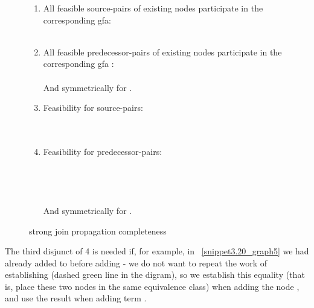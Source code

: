 \begin{figure}[H]
\begin{enumerate}
	\item All feasible source-pairs of existing nodes participate in the corresponding gfa:\\
	\\
	\item All feasible predecessor-pairs of existing nodes participate in the corresponding gfa :\\
	\\
	And symmetrically for .
	\item Feasibility for source-pairs:\\
	\\
	\\
	\item Feasibility for predecessor-pairs:\\
	\\
	\\
	\\
	\\
	And symmetrically for .
\end{enumerate}
\caption{strong join propagation completeness}
\label{strong_join_propagation_completeness}
\end{figure}

The third disjunct of 4 is needed if, for example, in ~\ref{snippet3.20_graph5} we had already added  to  before 
adding  - we do not want to repeat the work of establishing  (dashed green line in the digram), so we establish this equality (that is, place these two nodes in the same  equivalence class) when adding the node , and use the result when adding term
.


